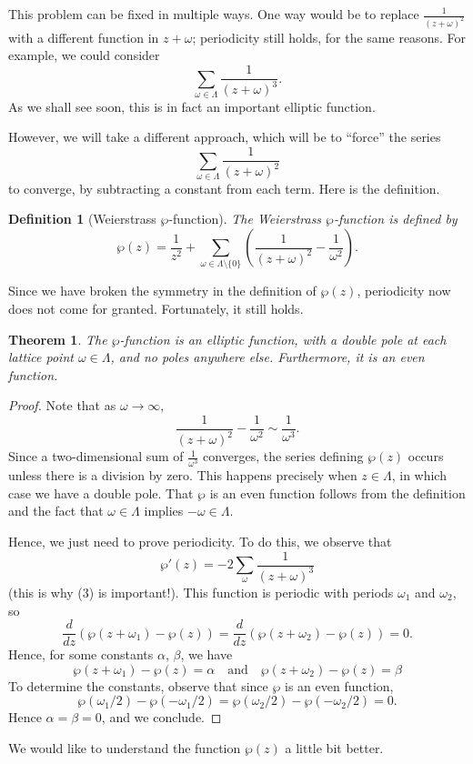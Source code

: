 \documentclass[12pt,reqno]{amsart}
\theoremstyle{plain}
\newtheorem{defn}[thm]{Definition}
\numberwithin{equation}{section}
\newtheorem{theorem}{Theorem}[section]
\begin{document}
This problem can be fixed in multiple ways. One way would be to replace $\frac{1}{(z+\omega)^2}$ with a different function in $z+\omega$; periodicity still holds, for the same reasons. For example, we could consider
\[\sum_{\omega\in \Lambda} \frac{1}{(z+\omega)^3}.\tag{3}\]
As we shall see soon, this is in fact an important elliptic function.

However, we will take a different approach, which will be to ``force'' the series \[\sum_{\omega\in \Lambda}\frac{1}{(z+\omega)^2}\] to converge, by subtracting a constant from each term. Here is the definition.

\begin{defn}[Weierstrass $\wp$-function]\label{defn: wp}
    The \textit{Weierstrass $\wp$-function} is defined by
        \[\wp(z) = \frac{1}{z^2}+\sum_{\omega \in \Lambda\setminus\{0\}}\left(\frac{1}{(z+\omega)^2}-\frac{1}{\omega^2}\right).\]
\end{defn}
Since we have broken the symmetry in the definition of $\wp(z)$, periodicity now does not come for granted. Fortunately, it still holds.

\begin{theorem}
    The $\wp$-function is an elliptic function, with a double pole at each lattice point $\omega\in \Lambda$, and no poles anywhere else. Furthermore, it is an even function.
\end{theorem}
\begin{proof}
    Note that as $\omega\to\infty$, 
    \[\frac{1}{(z+\omega)^2}-\frac{1}{\omega^2} \sim \frac{1}{\omega^3}.\]
    Since a two-dimensional sum of $\frac{1}{\omega^3}$ converges, the series defining $\wp(z)$ occurs unless there is a division by zero. This happens precisely when $z\in \Lambda$, in which case we have a double pole. That $\wp$ is an even function follows from the definition and the fact that $\omega\in \Lambda$ implies $-\omega\in \Lambda$.

    Hence, we just need to prove periodicity. To do this, we observe that
    \[\wp'(z) = -2 \sum_{\omega}\frac{1}{(z+\omega)^3}\]
    (this is why (3) is important!). This function is periodic with periods $\omega_1$ and $\omega_2$, so
    \[\frac{d}{dz}(\wp(z+\omega_1)-\wp(z)) = \frac{d}{dz}(\wp(z+\omega_2)-\wp(z)) = 0.\]
    Hence, for some constants $\alpha$, $\beta$, we have \[\wp(z+\omega_1)-\wp(z) = \alpha\quad \text{and} \quad \wp(z+\omega_2)-\wp(z)=\beta\]
    To determine the constants, observe that since $\wp$ is an even function, \[\wp(\omega_1/2) - \wp(-\omega_1/2) = \wp(\omega_2/2) - \wp(-\omega_2/2) =  0.\]
    Hence $\alpha= \beta = 0$, and we conclude.
\end{proof}
We would like to understand the function $\wp(z)$ a little bit better.
\end{document}
